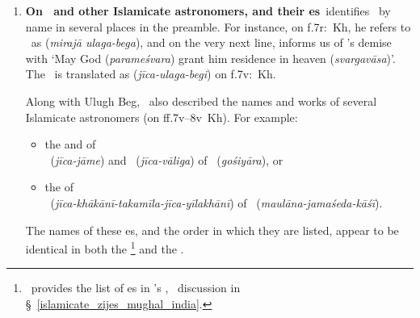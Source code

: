 \begin{enumerate}[topsep=0pt]
     \item \textbf{On \UlughBeg\ and other Islamicate astronomers, and their \zij es}\label{ulugh_beg_others_zijes_siddhantasindhu}\quad   \Nityananda\ identifies \UlughBeg\ by name in several places in the preamble. For instance, on f.\thinspace 7r:~Kh, he refers to \UlughBeg\ as  (\textit{mirajā ulaga-bega}), and on the very next line, informs us of \UlughBeg's demise with  `May God (\textit{parameśvara}) grant him residence in heaven (\textit{svargavāsa})'. The \ZijUlughBeg\ is translated as  (\textit{jīca-ulaga-begi}) on f.\thinspace 7v:~Kh.
     
    Along with Ulugh Beg, \Nityananda\ also described the names and works of several Islamicate astronomers (on ff.\thinspace 7v--8v~Kh). For example:
     \begin{itemize}
         \item the  and  of  \\
         \alZijalJami\ (\textit{jīca-jāme}) and \alZijalBaligh\ (\textit{jīca-vāliga}) of \Gilanifull\ (\textit{gośiyāra}), or
         \item the  
    of  \\
    \KhaqaniZijfull\ (\textit{jīca-khākānī-takamīla-jīca-yīlakhānī}) of \alKashifull\ (\textit{maulāna-jamaśeda-kāśī}).
     \end{itemize}
     The names of these \zij es, and the order in which they are listed, appear to be identical in both the \ZijiShahJahani\thinspace\footnote{\,\textcite[48]{Ghori} provides the list of \zij es in \MullaFarid's \ZijiShahJahani, \vid\ discussion in \S~\ref{islamicate_zijes_mughal_india}.}  and the \Siddhantasindhu.
    \end{enumerate}

